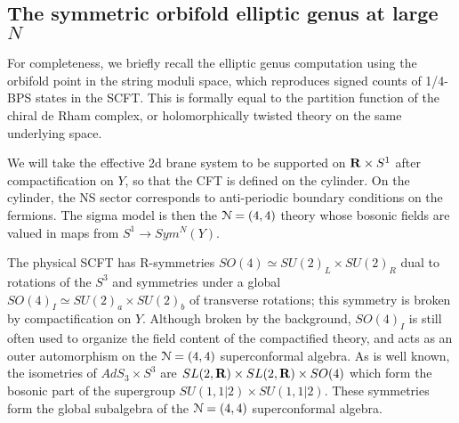 \documentclass[../main.tex]{subfiles}
\begin{document}
\subsection{The symmetric orbifold elliptic genus at large $N$}

For completeness, we briefly recall the elliptic genus computation using the orbifold point in the string moduli space, which reproduces signed counts of 1/4-BPS states in the SCFT. This is formally equal to the partition function of the chiral de Rham complex, or holomorphically twisted theory on the same underlying space. 

We will take the effective 2d brane system to be supported on $\mathbf{R} \times S^1$ after compactification on $Y$, so that the CFT is defined on the cylinder. On the cylinder, the NS sector corresponds to anti-periodic boundary conditions on the fermions. The sigma model is then the $\mathcal N = (4,4)$ theory whose bosonic fields are valued in maps from $S^1 \rightarrow Sym^N(Y)$.  

The physical SCFT has R-symmetries $SO(4) \simeq SU(2)_L \times SU(2)_R$ dual to rotations of the $S^3$ and symmetries under a global $SO(4)_I \simeq SU(2)_a \times SU(2)_b$ of transverse rotations; this symmetry is broken by compactification on $Y$. Although broken by the background, $SO(4)_I$ is still often used to organize the field content of the compactified theory, and acts as an outer automorphism on the $\mathcal N=(4, 4)$ superconformal algebra. As is well known, the isometries of $AdS_3 \times S^3$ are $SL(2, \mathbf{R}) \times SL(2, \mathbf{R}) \times SO(4)$ which form the bosonic part of the supergroup $SU(1,1|2) \times SU(1,1|2)$. These symmetries form the global subalgebra of the $\mathcal N= (4,4)$ superconformal algebra.
\end{document}
